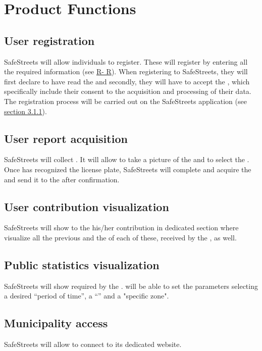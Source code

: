 \documentclass[../../RASD.tex]{subfiles}
\begin{document}
	
	\section{Product Functions}
	
	\subsection{User registration}
	SafeStreets will allow individuals to register. These will register by entering all the required information (see \hyperref[sect:3.2.5]{R- R}). When registering to SafeStreets, they will first declare to have read the  and secondly, they will have to accept the , which specifically include their consent to the acquisition and processing of their data. \\
	The  registration process will be carried out on the SafeStreets application (see \hyperref[sect:3.1.1]{section 3.1.1}). 
	
	\subsection{User report acquisition}
	SafeStreets will collect . It will allow  to take a picture of the  and to select the . Once  has recognized the license plate, SafeStreets will complete and acquire the  and send it to the  after  confirmation. 
	
	\subsection{User contribution visualization}
	SafeStreets will show to the  his/her contribution in dedicated section where visualize all the previous  and the  of each of these, received by the , as well.
	
	\subsection{Public statistics visualization}
	SafeStreets will show  required by the .  will be able to set the parameters selecting a desired “period of time”, a “” and a "specific zone". 
	
	\subsection{Municipality access}
	SafeStreets will allow  to connect to its dedicated website.  
	
\end{document}
